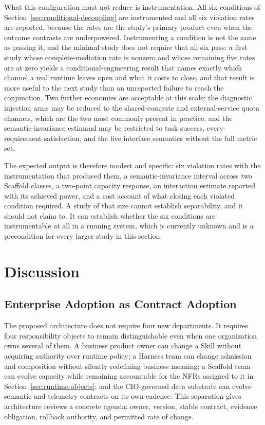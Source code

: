 What this configuration must not reduce is instrumentation. All six conditions of Section~\ref{sec:conditional-decoupling} are instrumented and all six violation rates are reported, because the rates are the study's primary product even when the outcome contrasts are underpowered. Instrumenting a condition is not the same as passing it, and the minimal study does not require that all six pass: a first study whose complete-mediation rate is nonzero and whose remaining five rates are at zero yields a conditional-engineering result that names exactly which channel a real runtime leaves open and what it costs to close, and that result is more useful to the next study than an unreported failure to reach the conjunction. Two further economies are acceptable at this scale: the diagnostic injection arms may be reduced to the shared-compute and external-service quota channels, which are the two most commonly present in practice, and the semantic-invariance estimand may be restricted to task success, every-requirement satisfaction, and the five interface semantics without the full metric set.

The expected output is therefore modest and specific: six violation rates with the instrumentation that produced them, a semantic-invariance interval across two Scaffold classes, a two-point capacity response, an interaction estimate reported with its achieved power, and a cost account of what closing each violated condition required. A study of that size cannot establish separability, and it should not claim to. It can establish whether the six conditions are instrumentable at all in a running system, which is currently unknown and is a precondition for every larger study in this section.

\section{Discussion}
\label{sec:discussion}

\subsection{Enterprise Adoption as Contract Adoption}

The proposed architecture does not require four new departments. It requires four responsibility objects to remain distinguishable even when one organization owns several of them. A business product owner can change a Skill without acquiring authority over runtime policy; a Harness team can change admission and composition without silently redefining business meaning; a Scaffold team can evolve capacity while remaining accountable for the NFRs assigned to it in Section~\ref{sec:runtime-objects}; and the CIO-governed data substrate can evolve semantic and telemetry contracts on its own cadence. This separation gives architecture reviews a concrete agenda: owner, version, stable contract, evidence obligation, rollback authority, and permitted rate of change.

